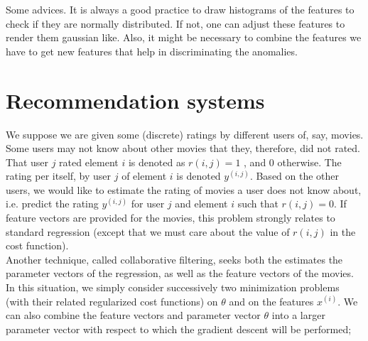 \documentclass[10pt,a4paper]{article}
\begin{document}
Some advices. It is always a good practice to draw histograms of the
features to check if they are normally distributed. If not, one can
adjust these features to render them gaussian like. Also, it might be
necessary to combine the features we have to get new features that
help in discriminating the anomalies.

\section{Recommendation systems}

We suppose we are given some (discrete) ratings by different users of,
say, movies. Some users may not know about other movies that they,
therefore, did not rated. That user $j$ rated element $i$ is denoted
as $r(i,j) = 1$ , and $0$ otherwise. The rating per itself, by user
$j$ of element $i$ is denoted $y^{(i,j)}$. Based on the other users, we
would like to estimate the rating of movies a user does not know
about, i.e. predict the rating $y^{(i,j)}$ for user $j$ and element
$i$ such that $r(i,j) = 0$. If feature vectors are provided for the
movies, this problem strongly relates to standard regression  (except
that we must care about the value of $r(i,j)$ in the cost function).\\

Another technique, called collaborative filtering, seeks both the
estimates the parameter vectors of the regression, as well as the
feature vectors of the movies. In this situation, we simply consider
successively two minimization problems (with their related regularized
cost functions) on $\theta$ and on the features $x^{(i)}$. We can also
combine the feature vectors and parameter vector $\theta$ into a
larger parameter vector with respect to which the gradient descent
will be performed;
\end{document}
